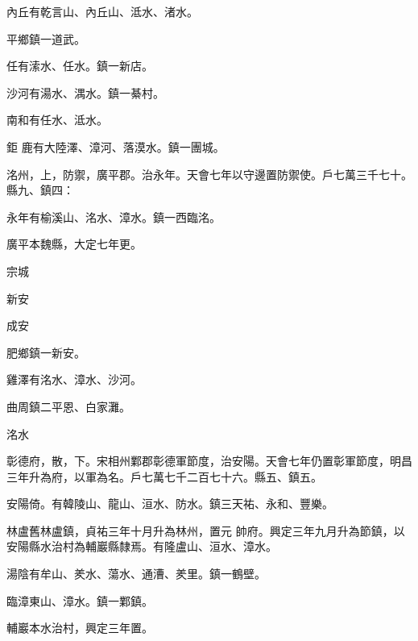 \begin{pinyinscope}
 內丘有乾言山、內丘山、泜水、渚水。



 平鄉鎮一道武。



 任有溹水、任水。鎮一新店。



 沙河有湯水、湡水。鎮一綦村。



 南和有任水、泜水。



 鉅
 鹿有大陸澤、漳河、落漠水。鎮一團城。



 洺州，上，防禦，廣平郡。治永年。天會七年以守邊置防禦使。戶七萬三千七十。縣九、鎮四：



 永年有榆溪山、洺水、漳水。鎮一西臨洺。



 廣平本魏縣，大定七年更。



 宗城



 新安



 成安



 肥鄉鎮一新安。



 雞澤有洺水、漳水、沙河。



 曲周鎮二平恩、白家灘。



 洺水



 彰德府，散，下。宋相州鄴郡彰德軍節度，治安陽。天會七年仍置彰軍節度，明昌三年升為府，以軍為名。戶七萬七千二百七十六。縣五、鎮五。



 安陽倚。有韓陵山、龍山、洹水、防水。鎮三天祐、永和、豐樂。



 林盧舊林盧鎮，貞祐三年十月升為林州，置元
 帥府。興定三年九月升為節鎮，以安陽縣水治村為輔巖縣隸焉。有隆盧山、洹水、漳水。



 湯陰有牟山、羑水、蕩水、通漕、羑里。鎮一鶴壁。



 臨漳東山、漳水。鎮一鄴鎮。



 輔巖本水治村，興定三年置。




\end{pinyinscope}
